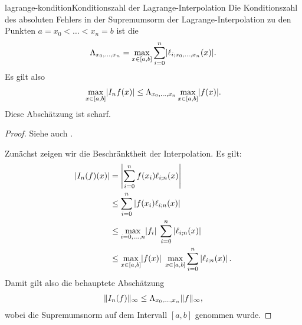 \begin{Satz*}{lagrange-kondition}{Konditionszahl der Lagrange-Interpolation}
  Die Konditionszahl des absoluten Fehlers in der Supremumsorm der
  Lagrange-Interpolation zu den Punkten $a = x_0 < \dots < x_n = b$
  ist die 
  \begin{gather}
    \Lambda_{x_0,\dots,x_n} = \max_{x\in [a,b]}
    \sum_{i=0}^n \lvert\ell_{i;x_0,\dots,x_n}(x)\rvert.
  \end{gather}
  Es gilt also
  \begin{gather}
    \max _{x\in[a,b]} \lvert I_n f(x)\rvert
    \le \Lambda_{x_0,\dots,x_n} \max _{x\in[a,b]} \lvert f(x)\rvert.
  \end{gather}
  Diese Abschätzung ist scharf.
\end{Satz*}

\begin{proof}
  Siehe auch \cite[Satz 7.3]{DeuflhardHohmann08}.
  
  Zunächst zeigen wir die Beschränktheit der Interpolation. Es gilt:
  \begin{align}
    \lvert I_n(f)(x)\rvert
    &= \left\vert\sum_{i=0}^n f(x_i) \ell_{i;n}(x)\right\vert \\
    &\le\sum_{i=0}^n \left\vert f(x_i) \ell_{i;n}(x)\right\vert \\
    &\le \max_{i=0,\dots,n} \lvert f_i\rvert
      \;\sum_{i=0}^n \left\vert \ell_{i;n}(x)\right\vert \\
    & \le \max_{x\in [a,b]} \lvert f(x)\rvert
       \;\max_{x\in [a,b]} \sum_{i=0}^n \left\vert \ell_{i;n}(x)\right\vert.
  \end{align}
  Damit gilt also die behauptete Abschätzung
  \begin{gather}
    \lVert I_n(f)\rVert_\infty
    \le \Lambda_{x_0,\dots,x_n} \lVert f\rVert_\infty,
  \end{gather}
  wobei die Supremumsnorm auf dem Intervall $[a,b]$ genommen wurde.


\end{proof}
